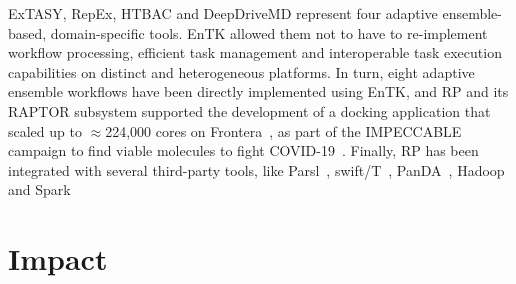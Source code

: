 \documentclass[preprint,12pt, a4paper]{elsarticle}
\begin{document}
ExTASY, RepEx, HTBAC and DeepDriveMD represent four adaptive ensemble-based,
domain-specific tools. EnTK allowed them not to have to re-implement workflow
processing, efficient task management and interoperable task execution
capabilities on distinct and heterogeneous platforms. In turn, eight adaptive
ensemble workflows have been directly implemented using EnTK, and RP and its
RAPTOR subsystem supported the development of a docking application that scaled
up to $\approx$224,000 cores on Frontera~\cite{merzky2022raptor}, as part of the
IMPECCABLE campaign to find viable molecules to fight
COVID-19~\cite{saadi2021impeccable}. Finally, RP has been integrated with
several third-party tools, like Parsl~\cite{alsaadi2021radical},
swift/T~\cite{turilli2017evaluating}, PanDA~\cite{merzky2019panda},
Hadoop~\cite{luckow2016hadoop} and Spark~\cite{paraskevakos2018task}


\section{Impact}\label{sec:impact}


\end{document}
